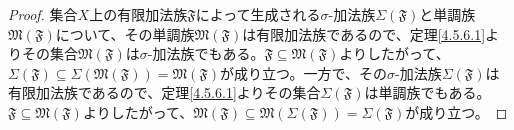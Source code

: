 \documentclass[dvipdfmx]{jsarticle}
\begin{document}
\begin{proof}
集合$X$上の有限加法族$\mathfrak{F}$によって生成される$\sigma$-加法族$\varSigma\left( \mathfrak{F} \right)$と単調族$\mathfrak{M}\left( \mathfrak{F} \right)$について、その単調族$\mathfrak{M}\left( \mathfrak{F} \right)$は有限加法族であるので、定理\ref{4.5.6.1}よりその集合$\mathfrak{M}\left( \mathfrak{F} \right)$は$\sigma$-加法族でもある。$\mathfrak{F \subseteq M}\left( \mathfrak{F} \right)$よりしたがって、$\varSigma\left( \mathfrak{F} \right) \subseteq \varSigma\left( \mathfrak{M}\left( \mathfrak{F} \right) \right) = \mathfrak{M}\left( \mathfrak{F} \right)$が成り立つ。一方で、その$\sigma$-加法族$\varSigma\left( \mathfrak{F} \right)$は有限加法族であるので、定理\ref{4.5.6.1}よりその集合$\varSigma\left( \mathfrak{F} \right)$は単調族でもある。$\mathfrak{F \subseteq M}\left( \mathfrak{F} \right)$よりしたがって、$\mathfrak{M}\left( \mathfrak{F} \right)\subseteq \mathfrak{M}\left( \varSigma\left( \mathfrak{F} \right) \right) = \varSigma\left( \mathfrak{F} \right)$が成り立つ。
\end{proof}
\end{document}
